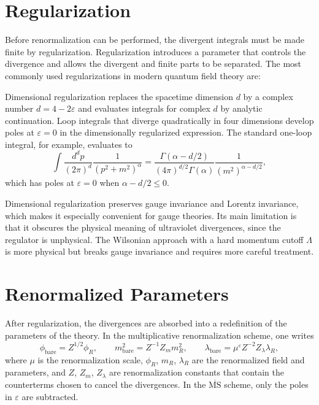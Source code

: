 \documentclass[11pt, twoside, openright]{book}
\theoremstyle{dotted}
\theoremstyle{definition}
\newcommand{\MSbar}{\overline{\mathrm{MS}}} %
\begin{document}
\section{Regularization}

Before renormalization can be performed, the divergent integrals must be made
finite by regularization. Regularization introduces a parameter that controls the
divergence and allows the divergent and finite parts to be separated. The most
commonly used regularizations in modern quantum field theory are:

Dimensional regularization replaces the spacetime dimension $d$ by a complex number
$d = 4 - 2\varepsilon$ and evaluates integrals for complex $d$ by analytic
continuation. Loop integrals that diverge quadratically in four dimensions develop
poles at $\varepsilon = 0$ in the dimensionally regularized expression. The standard
one-loop integral, for example, evaluates to
\begin{equation}
  \int \frac{d^dp}{(2\pi)^d}\frac{1}{(p^2+m^2)^\alpha}
  = \frac{\Gamma(\alpha - d/2)}{(4\pi)^{d/2}\Gamma(\alpha)}\frac{1}{(m^2)^{\alpha-d/2}},
  \label{eq:dim_reg_integral}
\end{equation}
which has poles at $\varepsilon = 0$ when $\alpha - d/2 \leq 0$.

Dimensional regularization preserves gauge invariance and Lorentz invariance, which
makes it especially convenient for gauge theories. Its main limitation is that it
obscures the physical meaning of ultraviolet divergences, since the regulator is
unphysical. The Wilsonian approach with a hard momentum cutoff $\Lambda$ is more
physical but breaks gauge invariance and requires more careful treatment.

\section{Renormalized Parameters}

After regularization, the divergences are absorbed into a redefinition of the
parameters of the theory. In the multiplicative renormalization scheme, one writes
\begin{equation}
  \phi_{\text{bare}} = Z^{1/2}\phi_R, \qquad
  m_{\text{bare}}^2 = Z^{-1}Z_m m_R^2, \qquad
  \lambda_{\text{bare}} = \mu^\varepsilon Z^{-2} Z_\lambda \lambda_R,
  \label{eq:renorm_parameters}
\end{equation}
where $\mu$ is the renormalization scale, $\phi_R$, $m_R$, $\lambda_R$ are the
renormalized field and parameters, and $Z$, $Z_m$, $Z_\lambda$ are renormalization
constants that contain the counterterms chosen to cancel the divergences. In the
$\MSbar$ scheme, only the poles in $\varepsilon$ are subtracted.
\end{document}
